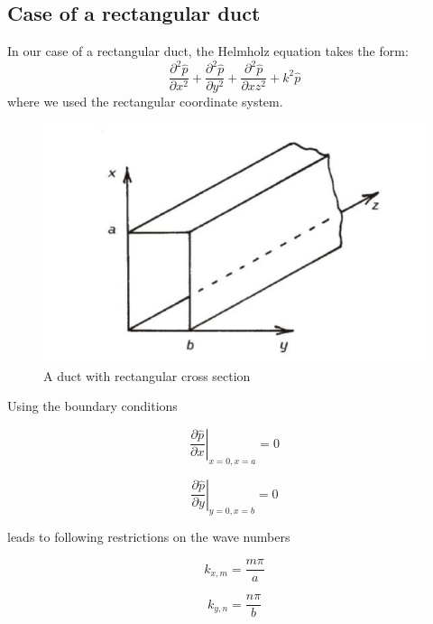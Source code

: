 \documentclass[11pt]{report} %
\begin{document}
\subsection{Case of a rectangular duct}
In our case of a rectangular duct, the Helmholz equation takes the form: 
\begin{equation}
\frac{\partial^2\hat{p}}{\partial x^2}+\frac{\partial^2\hat{p}}{\partial y^2}+\frac{\partial^2\hat{p}}{\partial xz^2}+k^2\hat{p}
\end{equation}
where we used the rectangular coordinate system. 

\begin{figure}[H]
\centering
\includegraphics[scale=0.8]{./Figures/duct_rect}
\caption{A duct with rectangular cross section}
\end{figure}

Using the boundary conditions 

\begin{equation}
\left.\frac{\partial\hat{p}}{\partial x}\right\rvert_{x=0,x=a}=0
\end{equation}

\begin{equation}
\left.\frac{\partial\hat{p}}{\partial y}\right\rvert_{y=0,x=b}=0
\end{equation}

leads to following restrictions on the wave numbers 

\begin{equation}
k_{x,m}=\frac{m\pi}{a}
\end{equation}

\begin{equation}
k_{y,n}=\frac{n\pi}{b}
\end{equation}
\end{document}
